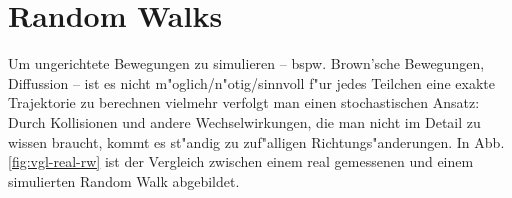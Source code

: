 \documentclass[a4paper]{book}
\begin{document}
\section{Random Walks}
\label{sec:random_walks}

Um ungerichtete Bewegungen zu simulieren -- bspw. Brown'sche
Bewegungen, Diffussion -- ist es nicht m"oglich/n"otig/sinnvoll f"ur
jedes Teilchen eine exakte Trajektorie zu berechnen vielmehr verfolgt
man einen stochastischen Ansatz: Durch Kollisionen und andere
Wechselwirkungen, die man nicht im Detail zu wissen braucht, kommt es
st"andig zu zuf"alligen Richtungs"anderungen. In
Abb. \ref{fig:vgl-real-rw} ist der Vergleich zwischen einem real
gemessenen und einem simulierten Random Walk abgebildet. 


\begin{figure}
  \centering

\end{figure}
\end{document}
